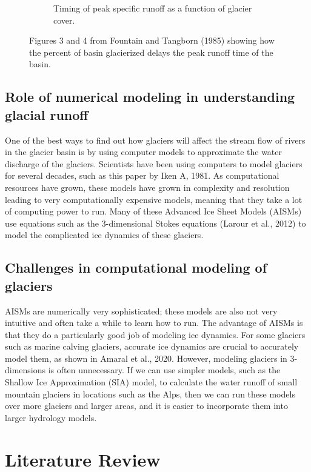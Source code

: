 \documentclass{article}
\begin{document}
\begin{figure}[h]
\begin{subfigure}[b]{0.45\textwidth}
        \caption{Timing of peak specific runoff as a function of glacier cover.}
        \label{fig:subfig2}
    \end{subfigure}
    \caption{Figures 3 and 4 from Fountain and Tangborn (1985) showing how the percent of basin glacierized delays the peak runoff time of the basin.}
    \label{fig:main_figure}
\end{figure}
\FloatBarrier
\subsection{Role of numerical modeling in understanding glacial runoff}
One of the best ways to find out how glaciers will affect the stream flow of rivers in the glacier basin is by using computer models to 
approximate the water discharge of the glaciers. Scientists have been using computers to model glaciers for several decades, such as this 
paper by Iken A, 1981. As computational resources have grown, these models have grown in complexity and resolution leading to very 
computationally expensive models, meaning that they take a lot of computing power to run. Many of these Advanced Ice Sheet Models (AISMs) 
use equations such as the 3-dimensional Stokes equations (Larour et al., 2012) to model the complicated ice dynamics of these glaciers.  
\subsection{Challenges in computational modeling of glaciers}
AISMs are numerically very sophisticated; these models are also not very intuitive and often take a while to learn how to run. The advantage 
of AISMs is that they do a particularly good job of modeling ice dynamics. For some glaciers such as marine calving glaciers, accurate ice 
dynamics are crucial to accurately model them, as shown in Amaral et al., 2020. However, modeling glaciers in 3-dimensions is often 
unnecessary. If we can use simpler models, such as the Shallow Ice Approximation (SIA) model, to calculate the water runoff of small 
mountain glaciers in locations such as the Alps, then we can run these models over more glaciers and larger areas, and it is easier to 
incorporate them into larger hydrology models. 

\section{Literature Review}
\end{document}
